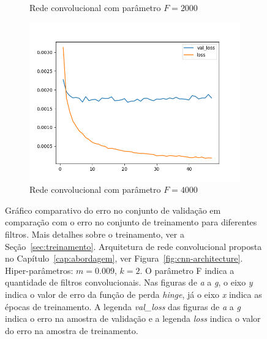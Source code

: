 \begin{figure}[p]
\begin{subfigure}{.5\textwidth}
  \caption{Rede convolucional com parâmetro $F = 2000$}
  \label{fig:cnn-2000-k-2}
\end{subfigure}
\begin{subfigure}{.5\textwidth}
  \centering
  \includegraphics[width=.8\linewidth]{figuras/ape-ajustes-hiper-parametros/cnn-4000-k-2.png}
  \caption{Rede convolucional com parâmetro $F = 4000$}
  \label{fig:cnn-4000-k-2}
\end{subfigure}
\caption[Gráfico comparativo do erro no conjunto de validação em comparação com o erro no conjunto de treinamento para diferentes filtros.]{Gráfico comparativo do erro no conjunto de validação em comparação com o erro no conjunto de treinamento para diferentes filtros. Mais detalhes sobre o treinamento, ver a Seção~\ref{sec:treinamento}. Arquitetura de rede convolucional proposta no Capítulo~\ref{cap:abordagem}, ver Figura~\ref{fig:cnn-architecture}. Hiper-parâmetros: $m = 0.009$, $k = 2$. O parâmetro F indica a quantidade de filtros convolucionais. Nas figuras de \emph{a} a \emph{g}, o eixo \emph{y} indica o valor de erro da função de perda \textit{hinge}, já o eixo \emph{x} indica as épocas de treinamento. A legenda \emph{val\_loss} das figuras de \emph{a} a \emph{g} indica o erro na amostra de validação e a legenda \emph{loss} indica o valor do erro na amostra de treinamento. }
\label{fig:treinamento-cnn-k-2-m-0009}
\end{figure}


